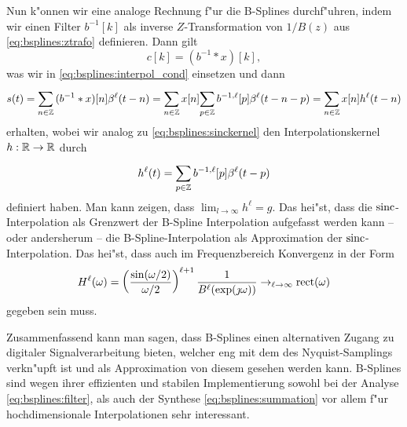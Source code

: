 Nun k"onnen wir eine analoge Rechnung f"ur die B-Splines durchf"uhren, indem wir einen Filter $b^{-1}[k]$ als inverse $Z$-Transformation von $1/B(z)$ aus \eqref{eq:bsplines:ztrafo} definieren. 
Dann gilt
\begin{equation}
    c[k] = (b^{-1} \ast x)[k],
\end{equation}
was wir in \eqref{eq:bsplines:interpol_cond} einsetzen und dann
\begin{equation}
    s(t) = {\sum\limits_{n \in \mathbb{Z}}^{}{
        (b^{-1} \ast x)[n] \beta^{\ell}(t - n)
    }} = {\sum\limits_{n \in \mathbb{Z}}^{}{
        x[n] {\sum\limits_{p \in \mathbb{Z}}^{}{
            b^{-1,\ell}[p] \beta^{\ell}(t - n - p)
        }}
    }} = {\sum\limits_{n \in \mathbb{Z}}^{}{
        x[n] h^\ell(t - n)
    }}
\end{equation}
erhalten, wobei wir analog zu \eqref{eq:bsplines:sinckernel} den Interpolationskernel $h: \mathbb{R} \rightarrow \mathbb{R}$ durch
\begin{equation}\label{bsplines_kernel}
    h^\ell(t) = {\sum\limits_{p \in \mathbb{Z}}^{}{
        b^{-1,\ell}[p] \beta^{\ell}(t - p)
    }}
\end{equation}
definiert haben. 
Man kann zeigen, dass $\lim_{l \rightarrow \infty} h^\ell = g$. 
Das hei"st, dass die $\operatorname*{sinc}$-Interpolation als Grenzwert der B-Spline Interpolation aufgefasst werden kann -- oder andersherum -- die B-Spline-Interpolation als Approximation der $\operatorname*{sinc}$-Interpolation. 
Das hei"st, dass auch im Frequenzbereich Konvergenz in der Form
\begin{equation}
    H^\ell(\omega) = \left(\frac{\sin(\omega/2)}{\omega/2}\right)^{\ell+1} \frac{1}{B^{\ell}(\exp(\jmath \omega))} \rightarrow_{\ell \rightarrow \infty} \operatorname*{rect}(\omega)
\end{equation} 
gegeben sein muss.

Zusammenfassend kann man sagen, dass B-Splines einen alternativen Zugang zu digitaler Signalverarbeitung bieten, welcher eng mit dem des Nyquist-Samplings verkn"upft ist und als Approximation von diesem gesehen werden kann. 
B-Splines sind wegen ihrer effizienten und stabilen Implementierung sowohl bei der Analyse \eqref{eq:bsplines:filter}, als auch der Synthese \eqref{eq:bsplines:summation} vor allem f"ur hochdimensionale Interpolationen sehr interessant.
